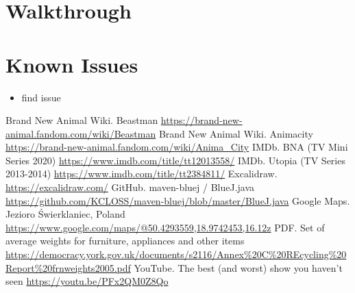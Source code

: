 \documentclass{article}
\begin{document}
\begin{multicols}{2}
        \section{Walkthrough}

        \section{Known Issues}
        
            \begin{itemize}[leftmargin=*]
                \item find issue
            \end{itemize}

    \end{multicols}

    \newpage

    \begin{thebibliography}{9}
        Brand New Animal Wiki. Beastman \url{https://brand-new-animal.fandom.com/wiki/Beastman}
        Brand New Animal Wiki. Animacity \url{https://brand-new-animal.fandom.com/wiki/Anima_City}
        IMDb. BNA (TV Mini Series 2020) \url{https://www.imdb.com/title/tt12013558/}
        IMDb. Utopia (TV Series 2013-2014) \url{https://www.imdb.com/title/tt2384811/}
        Excalidraw. \url{https://excalidraw.com/}
        GitHub. maven-bluej / BlueJ.java \url{https://github.com/KCLOSS/maven-bluej/blob/master/BlueJ.java}
        Google Maps. Jezioro Świerklaniec, Poland \url{https://www.google.com/maps/@50.4293559,18.9742453,16.12z}
        PDF. Set of average weights for furniture, appliances and other items \url{https://democracy.york.gov.uk/documents/s2116/Annex\%20C\%20REcycling\%20Report\%20frnweights2005.pdf}
        YouTube. The best (and worst) show you haven't seen \url{https://youtu.be/PFx2QM0Z8Qo}
    \end{thebibliography}  
    
    \newpage
\end{document}
